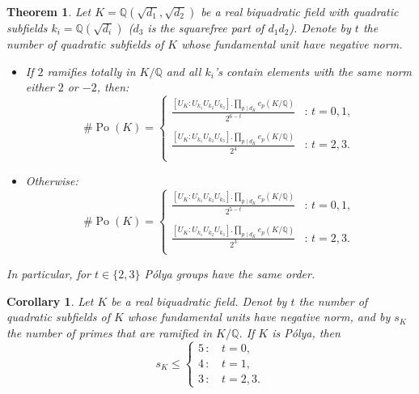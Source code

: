 \documentclass[10pt,a4paper]{amsart}
\newtheorem{theorem}{Theorem}
\newtheorem{corollary}{Corollary}
\DeclareMathOperator{\Po}{Po}
\begin{document}
\begin{theorem} \label{theorem, relatione between order of Polya group and unit index}
Let $K=\mathbb{Q}(\sqrt{d_1},\sqrt{d_2})$ be a real biquadratic field with quadratic subfields $k_i=\mathbb{Q}(\sqrt{d_i})$ ($d_3$ is the squarefree part of $d_1 d_2$). Denote by $t$ the number of quadratic subfields of $K$ whose fundamental unit have negative norm. 
\begin{itemize}
\item[(i)] If $2$ ramifies totally in $K/\mathbb{Q}$ and all $k_i$'s contain elements with the same norm either $2$ or $-2$, then:
\begin{equation*}
    \# \Po(K) = \begin{cases}
               \frac{	\left[U_K : U_{k_1} U_{k_2} U_{k_3}\right]. \prod_{p \mid d_K}e_p(K/\mathbb{Q})}{2^{6-t}}              & : \,  t = 0,1, \\
                & \\ 
               \frac{	\left[U_K : U_{k_1} U_{k_2} U_{k_3}\right]. \prod_{p \mid d_K}e_p(K/\mathbb{Q})}{2^4}              & : \, t =2,3.\\
           \end{cases}
\end{equation*}

\item[(ii)] Otherwise:
\begin{equation*}
    \# \Po(K) = \begin{cases}
               \frac{	\left[U_K : U_{k_1} U_{k_2} U_{k_3}\right]. \prod_{p \mid d_K}e_p(K/\mathbb{Q})}{2^{5-t}}              & : \,  t = 0,1, \\
               & \\
               \frac{	\left[U_K : U_{k_1} U_{k_2} U_{k_3}\right]. \prod_{p \mid d_K}e_p(K/\mathbb{Q})}{2^3}              & : \, t=2,3.\\
           \end{cases}
\end{equation*}
\end{itemize}
In particular, for $t\in \{2,3\}$  P\'olya groups have the same order.
\end{theorem}

\begin{corollary} \label{corollary, improving Zantema upper bound for Polya biquadratic fields}
	Let
$K$ be a real biquadratic field. Denot by $t$ the number of quadratic subfields of $K$ whose fundamental units have negative norm, and by $s_K$ the number of primes that are ramified in $K/\mathbb{Q}$. If $K$ is P\'olya, then
\begin{equation*}
s_K \leq \left\{
\begin{array}{rl}
5 \, :& \, t=0, \\
 4 \, :& \,   t=1, \\
 3 \, :& \,  t=2,3.
\end{array} \right.
\end{equation*}
\end{corollary}
\end{document}

